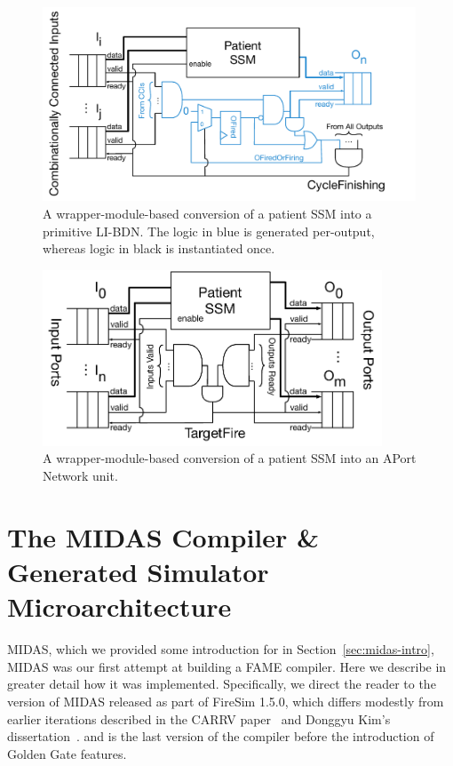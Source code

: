 \begin{figure}
    \centering
    \includegraphics[width=0.99\textwidth]{figures/libdn-wrapper.pdf}
    \caption{A wrapper-module-based conversion of a patient SSM into a primitive LI-BDN. The logic in blue
    is generated per-output, whereas logic in black is instantiated once.}
    \label{fig:libdn-wrapper}
\end{figure}

\begin{figure}
    \centering
    \includegraphics[width=0.9\textwidth]{figures/aport-network-wrapper.pdf}
    \caption{A wrapper-module-based conversion of a patient SSM into an APort Network unit.}
    \label{fig:aport-network-wrapper}
\end{figure}

\section{The MIDAS Compiler \& Generated Simulator Microarchitecture}\label{sec:midas-impl}
MIDAS, which we provided some introduction for in Section~\ref{sec:midas-intro}, MIDAS
was our first attempt at building a FAME compiler. Here we describe in greater
detail how it was implemented. Specifically, we direct the reader to the
version of MIDAS released as part of FireSim 1.5.0, which differs modestly from
earlier iterations described in the CARRV paper~\cite{MIDAS} and Donggyu Kim's
dissertation~\cite{DGKDissertation}. and is the last version of the compiler
before the introduction of Golden Gate features.

